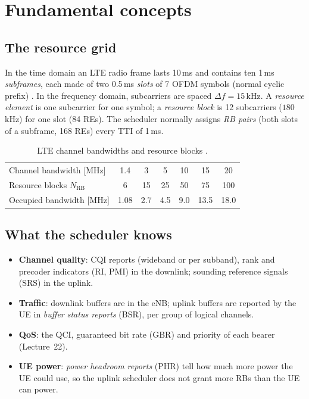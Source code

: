 \documentclass[11pt,a4paper]{article}
\begin{document}
\section{Fundamental concepts}

\subsection{The resource grid}
In the time domain an LTE radio frame lasts 10\,ms and contains ten 1\,ms \emph{subframes}, each
made of two 0.5\,ms \emph{slots} of 7 OFDM symbols (normal cyclic prefix) \cite{ts36211}. In the
frequency domain, subcarriers are spaced $\Delta f = 15$\,kHz. A \emph{resource element} is one
subcarrier for one symbol; a \emph{resource block} is 12 subcarriers ($180$\,kHz) for one slot
(84 REs). The scheduler normally assigns \emph{RB pairs} (both slots of a subframe, 168 REs) every
TTI of 1\,ms.

\begin{table}[htbp]
\centering\small
\caption{LTE channel bandwidths and resource blocks \cite{ts36211}.}\label{tab:bw}
\begin{tabular}{@{}lcccccc@{}}
\toprule
Channel bandwidth [MHz] & 1.4 & 3 & 5 & 10 & 15 & 20 \\
Resource blocks $N_{\mathrm{RB}}$ & 6 & 15 & 25 & 50 & 75 & 100 \\
Occupied bandwidth [MHz] & 1.08 & 2.7 & 4.5 & 9.0 & 13.5 & 18.0 \\
\bottomrule
\end{tabular}
\end{table}

\begin{acnfigure}
  \caption{One downlink RB pair (12 subcarriers $\times$ 14 symbols) with a two-symbol control
  region and two-port cell-specific reference signals.}
  \label{fig:grid}
\end{acnfigure}

\subsection{What the scheduler knows}
\begin{itemize}
  \item \textbf{Channel quality}: CQI reports (wideband or per subband), rank and precoder
        indicators (RI, PMI) in the downlink; sounding reference signals (SRS) in the uplink.
  \item \textbf{Traffic}: downlink buffers are in the eNB; uplink buffers are reported by the UE in
        \emph{buffer status reports} (BSR), per group of logical channels.
  \item \textbf{QoS}: the QCI, guaranteed bit rate (GBR) and priority of each bearer (Lecture~22).
  \item \textbf{UE power}: \emph{power headroom reports} (PHR) tell how much more power the UE could
        use, so the uplink scheduler does not grant more RBs than the UE can power.
\end{itemize}
\end{document}
